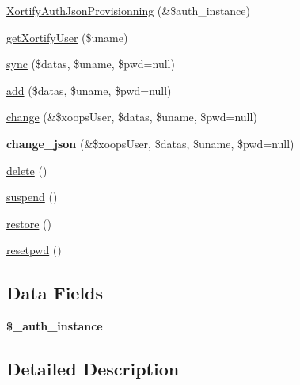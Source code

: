 \begin{DoxyCompactItemize}
\item 
\hyperlink{class_xortify_auth_json_provisionning_acaf0cac25f9cd967c0329db929627521}{Xortify\-Auth\-Json\-Provisionning} (\&\$auth\-\_\-instance)
\item 
\hyperlink{class_xortify_auth_json_provisionning_a041d726ac26672547ed1504e8e0117aa}{get\-Xortify\-User} (\$uname)
\item 
\hyperlink{class_xortify_auth_json_provisionning_a35dc08b0f2138eb818ff95345b73bcff}{sync} (\$datas, \$uname, \$pwd=null)
\item 
\hyperlink{class_xortify_auth_json_provisionning_adfc9fcef01e7bd7b2f47e8e79d51fc63}{add} (\$datas, \$uname, \$pwd=null)
\item 
\hyperlink{class_xortify_auth_json_provisionning_ae1f0971b9712c794620cf309164e43af}{change} (\&\$xoops\-User, \$datas, \$uname, \$pwd=null)
\item 
\hypertarget{class_xortify_auth_json_provisionning_a94f4e0408f26e65abca347ec883f4ec9}{{\bfseries change\-\_\-json} (\&\$xoops\-User, \$datas, \$uname, \$pwd=null)}\label{class_xortify_auth_json_provisionning_a94f4e0408f26e65abca347ec883f4ec9}

\item 
\hyperlink{class_xortify_auth_json_provisionning_a13bdffdd926f26b825ea57066334ff01}{delete} ()
\item 
\hyperlink{class_xortify_auth_json_provisionning_ad73006a505121228f3b075c2409787d2}{suspend} ()
\item 
\hyperlink{class_xortify_auth_json_provisionning_aa1371f22826cf8cde4454c9b467203d0}{restore} ()
\item 
\hyperlink{class_xortify_auth_json_provisionning_a06d70fbd3a2db390b6f2530c0076628e}{resetpwd} ()
\end{DoxyCompactItemize}
\subsection*{Data Fields}
\begin{DoxyCompactItemize}
\item 
\hypertarget{class_xortify_auth_json_provisionning_a486ed878bb5a7188c99ac4c9ee46ac6e}{{\bfseries \$\-\_\-auth\-\_\-instance}}\label{class_xortify_auth_json_provisionning_a486ed878bb5a7188c99ac4c9ee46ac6e}

\end{DoxyCompactItemize}


\subsection{Detailed Description}


